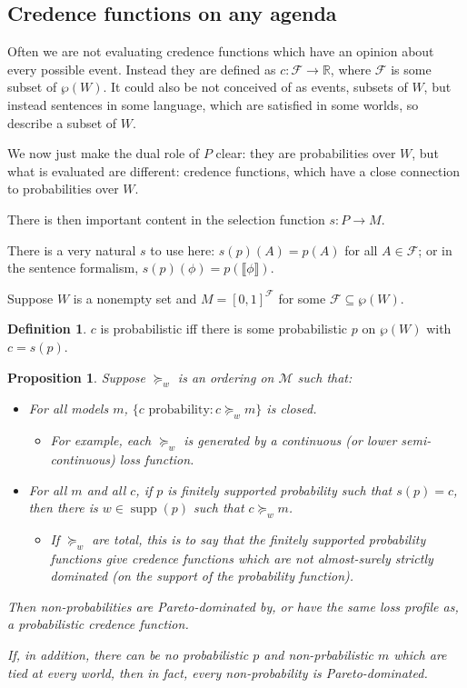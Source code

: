 \documentclass[11pt]{article}
\newtheorem{proposition}[theorem]{Proposition}
\theoremstyle{definition}
\newtheorem{definition}[theorem]{Definition}
\theoremstyle{remark}
\newcommand{\R}{\mathbb R}
\newcommand{\M}{\mathcal M}
\newcommand{\agenda}{\mathcal F}
\newcommand{\supp}{\operatorname{supp}}
\begin{document}
\subsection{Credence functions on any agenda}

Often we are not evaluating credence functions which have an opinion about every possible event. Instead they are defined as $c:\agenda\to\R$, where $\agenda$ is some subset of $\wp(W)$. It could also be not conceived of as events, subsets of $W$, but instead sentences in some language, which are satisfied in some worlds, so describe a subset of $W$.

We now just make the dual role of $P$ clear: they are probabilities over $W$, but what is evaluated are different: credence functions, which have a close connection to probabilities over $W$. 

There is then important content in the selection function $s:P\to M$. 

There is a very natural $s$ to use here: $s(p)(A)=p(A)$ for all $A\in \agenda$; or in the sentence formalism, $s(p)(\phi)=p(\llbracket \phi\rrbracket)$. 


Suppose $W$ is a nonempty set and $M=[0,1]^\agenda$ for some $\agenda\subseteq \wp(W)$.

\begin{definition}
	$c$ is probabilistic iff there is some probabilistic $p$ on $\wp(W)$ with $c=s(p)$. 
\end{definition}

\begin{proposition}
	Suppose $\succeq_w$ is an ordering on $\M$ such that:
	\begin{itemize}
		\item For all models $m$, $\{c\text{ probability} : c\succeq_w m\}$ is closed. 
		\begin{itemize}
			\item For example, each $\succeq_w$ is generated by a continuous (or lower semi-continuous) loss function.
		\end{itemize}
		\item For all $m$ and all $c$, if $p$ is finitely supported probability such that $s(p)=c$, then there is $w\in \supp(p)$ such that $c\succeq_w m$.
		\begin{itemize}
			\item If $\succeq_w$ are total, this is to say that the finitely supported probability functions give credence functions which are not almost-surely strictly dominated (on the support of the probability function). 
		\end{itemize}
	\end{itemize}
	Then non-probabilities are Pareto-dominated by, or have the same loss profile as, a probabilistic credence function. 
	
	If, in addition, there can be no probabilistic $p$ and non-prbabilistic $m$ which are tied at every world, then in fact, every non-probability is Pareto-dominated. 
\end{proposition}
\end{document}
